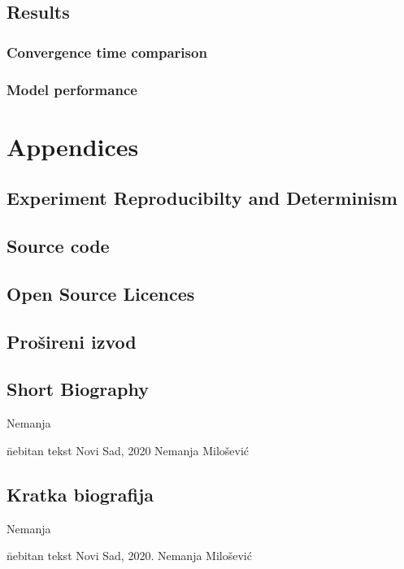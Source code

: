 \documentclass[b5paper]{book}
\let\cite\parencite
\newcommand{\skica}[1]{
    \noindent \framebox{\parbox[c]{0.9\textwidth}{  {\small** {#1}  }}
    \newline }
}
\begin{document}
\chapter{Results}
\section{Convergence time comparison}
\section{Model performance}

\part{Appendices}
\chapter{Experiment Reproducibilty and Determinism}
\chapter{Source code}
\chapter{Open Source Licences}
\backmatter


{
  \raggedright
\printbibliography[heading=bibintoc]
}


\chapter{Prošireni izvod}




\chapter{Short Biography}


Nemanja \cite{novak2010comparison}

\vfill


\begin{tabbing}
  \hspace{0.7\textwidth} \= nebitan tekst \kill
  Novi Sad, 2020 \> Nemanja Milošević
\end{tabbing}

\begin{otherlanguage}{serbian}
\chapter{Kratka biografija}

Nemanja

\vfill


\begin{tabbing}
  \hspace{0.7\textwidth} \= nebitan tekst \kill
  Novi Sad, 2020. \> Nemanja Milošević\\
  \\
  \> \makebox[0.3\textwidth]{\dotfill}
\end{tabbing}

\end{otherlanguage}


\end{document}
